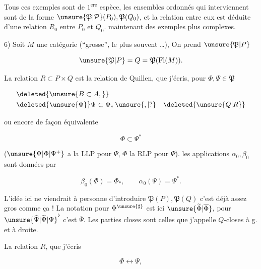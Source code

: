 
 Tous ces exemples sont de $1^{\mathrm{ere}}$ espèce, les ensembles ordonnés qui interviennent sont de la forme $\unsure{\mathfrak P|\mathcal P}(P_0),\mathfrak P(Q_0)$, et la relation entre eux est déduite d'une relation $R_0$ entre $P_0$ et $Q_0$.  maintenant des exemples plus complexes.

6) Soit $M$ une catégorie (``grosse'', le plus souvent \ldots), On prend $\unsure{\mathfrak P|P}$

\[
 \unsure{\mathfrak P|P}=Q=\mathfrak P(\mathrm{Fl}(M)).
\]

La relation $R\subset P\times Q$ est la relation de Quillen, que j'écris, pour $\Phi,\Psi\in\mathfrak P$

\[
 \begin{aligned}
 &\deleted{\unsure{B\subset A,}}\\
 &\deleted{\unsure{\Phi}}\Psi\subset\Phi_*\,\unsure{,|?}\quad\deleted{\unsure{Q|R}}
 \end{aligned}
\]

ou encore de façon équivalente

\[
 \Phi\subset\Psi^*
\]

($\unsure{\Psi|\Phi|\Psi^{+}}$ a la LLP pour $\Psi$, $\Phi$ la RLP pour $\Psi$).   les applications $\alpha_0,\beta_0$ sont données par

\[
 \beta_0(\Phi)=\Phi_*,\qquad \alpha_0(\Psi)=\Psi^*.
\]

L'idée ici ne viendrait à personne d'introduire $\mathfrak P(P),\mathfrak P(Q)$  c'est déjà assez gros comme ça ! La notation pour $\Phi^{\unsure{\sharp}}$ est ici $\unsure{\widetilde\Phi|\overline\Phi}$, pour $\unsure{\widehat{\Psi}|\widetilde{\Psi}|\Psi}^\flat$ c'est $\overline\Psi$. Les parties closes sont celles que j'appelle $Q$-closes à g. et à droite.

La relation $R$, que j'écris

\[
 \Phi\longleftrightarrow\Psi,
\]
